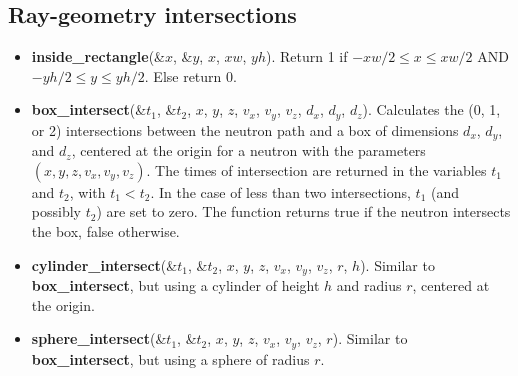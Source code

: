 \subsection{Ray-geometry intersections}
\begin{itemize}
\item \textbf{inside\_rectangle}(\&$x$, \&$y$, $x$, $xw$, $yh$).
  Return 1 if $-xw/2 \leq x \leq xw/2$ AND $-yh/2 \leq y \leq yh/2$.
  Else return 0.
\item \textbf{box\_intersect}(\&$t_1$, \&$t_2$, $x$, $y$, $z$, $v_x$, $v_y$, $v_z$,
  $d_x$, $d_y$, $d_z$). Calculates the (0, 1, or 2) intersections between
  the neutron path and a box of dimensions $d_x$, $d_y$, and $d_z$,
  centered at the origin for a neutron with the parameters
  $(x,y,z,v_x,v_y,v_z)$. The times of intersection are returned
  in the variables $t_1$ and $t_2$, with $t_1 < t_2$. In the case
  of less than two intersections, $t_1$ (and possibly $t_2$) are set to
  zero. The function returns true if the neutron intersects the box,
  false otherwise.
\item \textbf{cylinder\_intersect}(\&$t_1$, \&$t_2$, $x$, $y$, $z$, $v_x$, $v_y$, $v_z$,
  $r$, $h$).  Similar to \textbf{box\_intersect}, but using a cylinder of height $h$ and radius $r$,
  centered at the origin.
\item \textbf{sphere\_intersect}(\&$t_1$, \&$t_2$, $x$, $y$, $z$, $v_x$, $v_y$, $v_z$,
  $r$). Similar to \textbf{box\_intersect}, but using a sphere
  of radius $r$.
\end{itemize}

